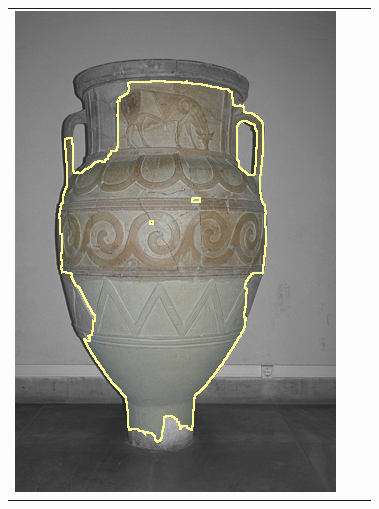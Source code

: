 \documentclass[runningheads]{llncs}
\begin{document}
\begin{figure}
\begin{tabular}{ccc}
		\includegraphics[scale=0.2]{images/segmentation/bc/vase/gc-seg.png} &

\end{tabular}
\end{figure}
\end{document}
